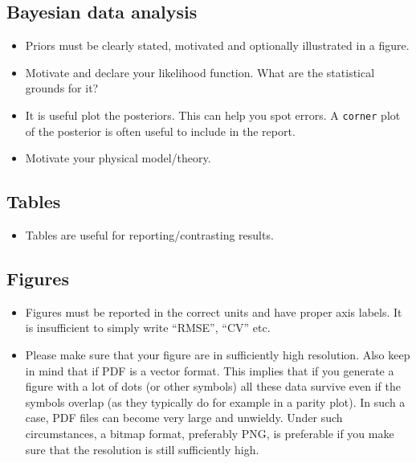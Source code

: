 \documentclass[12pt,a4paper]{article}
\begin{document}
\subsection{Bayesian data analysis}

\begin{itemize}
\item
    Priors must be clearly stated, motivated and optionally illustrated in a figure. 
\item
    Motivate and declare your likelihood function. What are the statistical grounds for it?
\item
    It is useful plot the posteriors.
    This can help you spot errors. A \texttt{corner} plot of the posterior is often useful to include in the report. 
\item Motivate your physical model/theory.
\end{itemize}

\subsection{Tables}

\begin{itemize}
\item
    Tables are  useful for reporting/contrasting
  results. 
\end{itemize}

\subsection{Figures}

\begin{itemize}
\item 
    Figures must be reported in the correct units and have proper axis labels.
    It is insufficient to simply write ``RMSE'', ``CV'' etc.
\item
    Please make sure that your figure are in sufficiently high resolution.
    Also keep in mind that if PDF is a vector format.
    This implies that if you generate a figure with a lot of dots (or other symbols) all these data survive even if the symbols overlap (as they typically do for example in a parity plot).
    In such a case, PDF files can become very large and unwieldy.
    Under such circumstances, a bitmap format, preferably PNG, is preferable if you make sure that the resolution is still sufficiently high.
\end{itemize}
\end{document}
